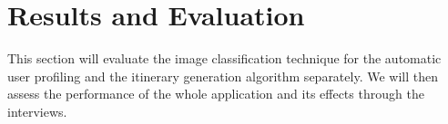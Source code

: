
\section{Results and Evaluation}
\label{evaluation}

This section will evaluate the image
classification technique for the automatic user profiling and the itinerary
generation algorithm separately. We will then assess the performance of the
whole application and its effects through the interviews.




